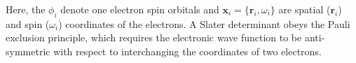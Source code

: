 Here, the $\phi_i$ denote one electron spin orbitals and
$\mathbf{x}_i=\{\mathbf{r}_i,\omega_i\}$ are spatial ($\mathbf{r}_i$) and spin
($\omega_i$) coordinates of the electrons. A Slater determinant obeys the Pauli
exclusion principle, which requires the electronic wave function to be
anti-symmetric with respect to interchanging the coordinates of two electrons.
